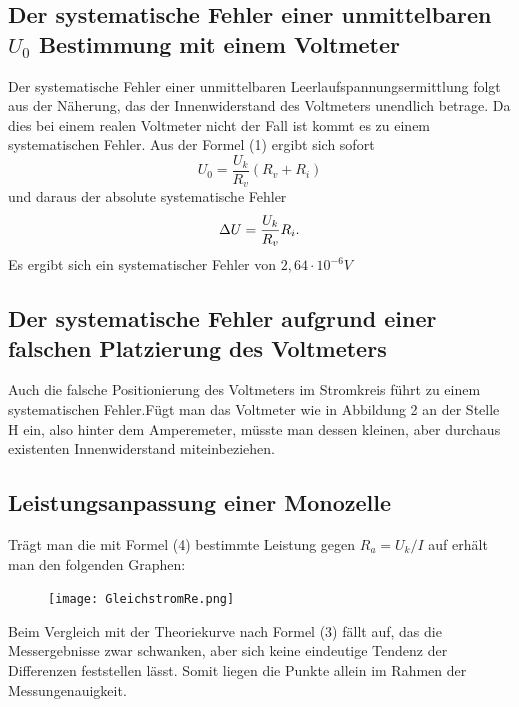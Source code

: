 \subsection{Der systematische Fehler einer unmittelbaren $U_0$ Bestimmung mit einem Voltmeter}
Der systematische Fehler einer unmittelbaren Leerlaufspannungsermittlung folgt aus der Näherung, das
der Innenwiderstand des Voltmeters unendlich betrage. Da dies bei einem realen Voltmeter nicht der
Fall ist kommt es zu einem systematischen Fehler.
Aus der Formel (1) ergibt sich sofort
\begin{equation}
U_0 = \frac{U_k}{R_v}(R_v + R_i)
\end{equation}
und daraus der absolute systematische Fehler
\begin{equation}
\Delta U = \frac{U_k}{R_v}R_i \text.
\end{equation}
Es ergibt sich ein systematischer Fehler von $2,64 \cdot 10^{-6} V$





\subsection{Der systematische Fehler aufgrund einer falschen Platzierung des Voltmeters}
Auch die falsche Positionierung des Voltmeters im Stromkreis führt zu einem
systematischen Fehler.Fügt man das Voltmeter wie in Abbildung 2 an der Stelle H
ein, also hinter dem Amperemeter, müsste man dessen kleinen, aber durchaus existenten
Innenwiderstand miteinbeziehen.

\newpage
\subsection{Leistungsanpassung einer Monozelle}
Trägt man die mit Formel (4) bestimmte Leistung gegen $R_a = U_k/I$ auf erhält man
den folgenden Graphen:
\begin{figure}[H]
	\centering
	\caption{}
	\texttt{[image: GleichstromRe.png]}
	\label{fig:GleichstromLeistung}
\end{figure}
Beim Vergleich mit der Theoriekurve nach Formel (3) fällt auf, das die Messergebnisse zwar schwanken, aber sich keine eindeutige Tendenz der Differenzen feststellen lässt. Somit liegen die Punkte allein im Rahmen der Messungenauigkeit.
